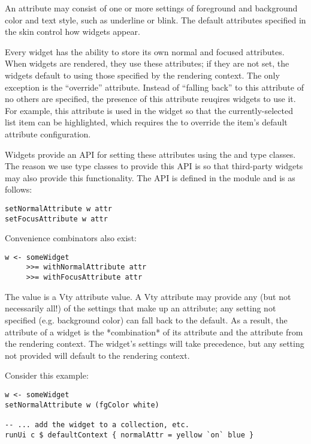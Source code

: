 An attribute may consist of one or more settings of foreground and
background color and text style, such as underline or blink.  The
default attributes specified in the skin control how widgets appear.

Every widget has the ability to store its own normal and focused
attributes.  When widgets are rendered, they use these attributes; if
they are not set, the widgets default to using those specified by the
rendering context.  The only exception is the ``override'' attribute.
Instead of ``falling back'' to this attribute of no others are
specified, the presence of this attribute reuqires widgets to use it.
For example, this attribute is used in the  widget so that
the currently-selected list item can be highlighted, which requires
the  to override the item's default attribute configuration.

Widgets provide an API for setting these attributes using the
 and  type classes.  The reason we
use type classes to provide this API is so that third-party widgets
may also provide this functionality.  The API is defined in the
 module and is as follows:

\begin{verbatim}
setNormalAttribute w attr
setFocusAttribute w attr
\end{verbatim}

Convenience combinators also exist:

\begin{verbatim}
w <- someWidget
     >>= withNormalAttribute attr
     >>= withFocusAttribute attr
\end{verbatim}

The  value is a Vty attribute value.  A Vty attribute may provide
any (but not necessarily all!) of the settings that make up an
attribute; any setting not specified (e.g. background color) can fall
back to the default.  As a result, the attribute of a widget is the
*combination* of its attribute and the attribute from the rendering
context.  The widget's settings will take precedence, but any setting
not provided will default to the rendering context.

Consider this example:

\begin{verbatim}
w <- someWidget
setNormalAttribute w (fgColor white)

-- ... add the widget to a collection, etc.
runUi c $ defaultContext { normalAttr = yellow `on` blue }
\end{verbatim}

